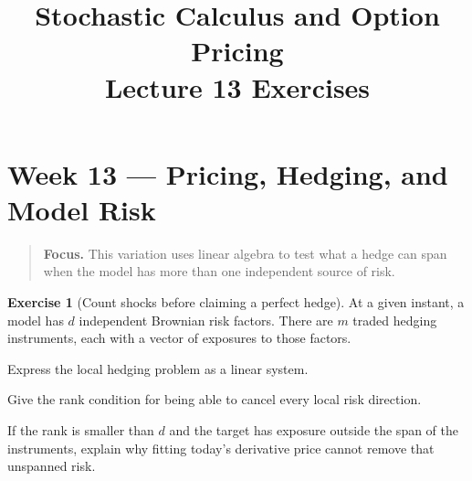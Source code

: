 \documentclass[11pt]{article}
\title{Stochastic Calculus and Option Pricing\\Lecture 13 Exercises}
\author{}
\date{}
\theoremstyle{definition}
\newtheorem{exercise}{Exercise}[section]
\newcommand{\lecturesummary}[1]{\begin{quote}\small\textbf{Focus.} #1\end{quote}}
\begin{document}
\maketitle
\vspace{-1.2em}
\setcounter{section}{12}
\fi

\section{Week 13 --- Pricing, Hedging, and Model Risk}
\lecturesummary{This variation uses linear algebra to test what a hedge can
span when the model has more than one independent source of risk.}

\begin{exercise}[Count shocks before claiming a perfect hedge]
At a given instant, a model has \(d\) independent Brownian risk factors.
There are \(m\) traded hedging instruments, each with a vector of exposures
to those factors.
\begin{exparts}
  \item Express the local hedging problem as a linear system.
  \item Give the rank condition for being able to cancel every local risk
  direction.
  \item If the rank is smaller than \(d\) and the target has exposure outside
  the span of the instruments, explain why fitting today's derivative price
  cannot remove that unspanned risk.
\end{exparts}
\end{exercise}


\ifdefined\ExercisesSynthesis\else
\end{document}
